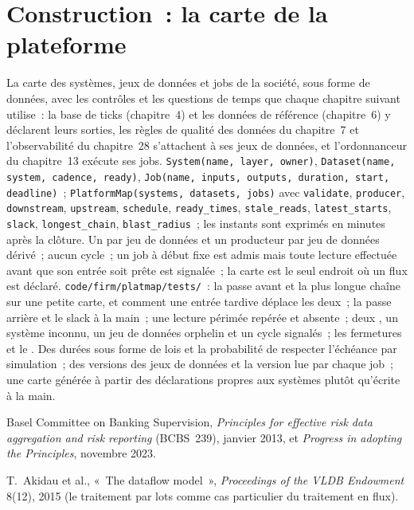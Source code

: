 \section{Construction~: la carte de la plateforme}\label{bld:pl:the-platform-map:platmap}

\begin{build}
 La carte des systèmes, jeux de données et jobs de la société, sous forme de données, avec les contrôles et les questions de temps que chaque
chapitre suivant utilise~: la base de ticks (chapitre~4) et les données de référence (chapitre~6) y déclarent leurs sorties, les règles de qualité des données
du chapitre~7 et l'observabilité du chapitre~28 s'attachent à ses jeux de données, et l'ordonnanceur du chapitre~13 exécute ses jobs.
 \texttt{System(name, layer, owner)}, \texttt{Dataset(name, system, cadence, ready)},
\texttt{Job(name, inputs, outputs, duration, start, deadline)}~; \texttt{PlatformMap(systems, datasets, jobs)} avec \texttt{validate},
\texttt{producer}, \texttt{downstream}, \texttt{upstream}, \texttt{schedule}, \texttt{ready\_times}, \texttt{stale\_reads},
\texttt{latest\_starts}, \texttt{slack}, \texttt{longest\_chain}, \texttt{blast\_radius}~; les instants sont exprimés en minutes après la clôture.
 Un  par jeu de données et un producteur par jeu de données dérivé~; aucun cycle~; un job à début fixe est admis
mais toute lecture effectuée avant que son entrée soit prête est signalée~; la carte est le seul endroit où un flux est déclaré.
 \texttt{code/firm/platmap/tests/}~: la passe avant et la plus longue chaîne sur une petite carte, et comment une
entrée tardive déplace les deux~; la passe arrière et le slack à la main~; une lecture périmée repérée et absente~; deux , un
système inconnu, un jeu de données orphelin et un cycle signalés~; les fermetures et le .
 Des durées sous forme de lois et la probabilité de respecter l'échéance par simulation~; des versions des jeux de données
et la version lue par chaque job~; une carte générée à partir des déclarations propres aux systèmes plutôt qu'écrite à la main.
\end{build}

\begin{omsources}
\item Basel Committee on Banking Supervision, \emph{Principles for effective risk data aggregation and risk reporting}
(BCBS~239), janvier 2013, et \emph{Progress in adopting the Principles}, novembre 2023.
\item T.~Akidau et al., «~The dataflow model~», \emph{Proceedings of the VLDB Endowment} 8(12), 2015 (le traitement par lots comme cas particulier
du traitement en flux).
\end{omsources}

